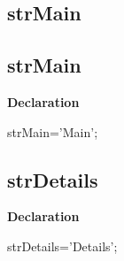 \documentclass{report}
\newif\ifpdf
\begin{document}
\subsection*{\large{\textbf{strMain}}\normalsize\hspace{1ex}\hrulefill}
\else
\subsection*{strMain}
\fi
\label{trstrings-strMain}
\begin{list}{}{
\setlength{\itemindent}{0cm}
\setlength{\listparindent}{0cm}
\setlength{\leftmargin}{\evensidemargin}
\addtolength{\leftmargin}{\tmplength}
\settowidth{\labelsep}{X}
\addtolength{\leftmargin}{\labelsep}
\setlength{\labelwidth}{\tmplength}
}
\item[\textbf{Declaration}\hfill]
\ifpdf
\begin{flushleft}
\fi
\begin{ttfamily}
strMain='Main';\end{ttfamily}

\ifpdf
\end{flushleft}
\fi

\end{list}
\ifpdf
\subsection*{\large{\textbf{strDetails}}\normalsize\hspace{1ex}\hrulefill}
\else
\subsection*{strDetails}
\fi
\label{trstrings-strDetails}
\begin{list}{}{
\setlength{\itemindent}{0cm}
\setlength{\listparindent}{0cm}
\setlength{\leftmargin}{\evensidemargin}
\addtolength{\leftmargin}{\tmplength}
\settowidth{\labelsep}{X}
\addtolength{\leftmargin}{\labelsep}
\setlength{\labelwidth}{\tmplength}
}
\item[\textbf{Declaration}\hfill]
\ifpdf
\begin{flushleft}
\fi
\begin{ttfamily}
strDetails='Details';\end{ttfamily}

\ifpdf
\end{flushleft}
\fi

\end{list}
\ifpdf
\end{document}

